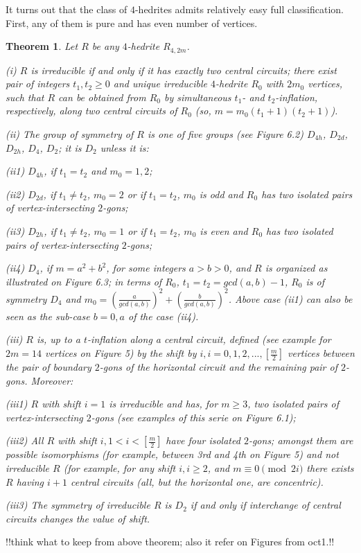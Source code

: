 \documentclass[12pt]{article}
\newtheorem{theor}{Theorem}
\begin{document}
It turns out that the class of $4$-hedrites
admits relatively easy full classification.
First, any of them is pure and has even number of vertices.



\begin{theor}

Let $R$ be any $4$-hedrite $R_{4,2m}$.

(i) $R$ is irreducible if and only if it has exactly two central
circuits; there exist pair of integers
$t_1,t_2 \ge 0$ and
unique irreducible $4$-hedrite $R_0$ with $2m_0$ vertices, such that $R$ can be obtained from
$R_0$ by simultaneous $t_1$- and $t_2$-inflation, respectively, along two
central circuits of $R_0$ (so, $m=m_0(t_1+1)(t_2+1)$).

(ii) The group of symmetry of $R$ is one of five groups (see Figure 6.2)
$D_{4h}$, $D_{2d}$, $D_{2h}$, $D_4$, $D_2$; it is $D_2$ unless it is:     

(ii1) $D_{4h}$, if $t_1=t_2$ and $m_0=1,2$;

(ii2) $D_{2d}$, if $t_1 \neq t_2$, $m_0=2$ or if $t_1=t_2$, $m_0$ is odd
and $R_0$ has two isolated pairs of vertex-intersecting $2$-gons;

(ii3) $D_{2h}$, if $t_1 \neq t_2$, $m_0=1$ or if $t_1=t_2$, $m_0$ is even
and $R_0$ has two isolated pairs of vertex-intersecting $2$-gons;

(ii4) $D_4$, if $m=a^2+b^2$, for some integers $a>b>0$, and $R$ is organized as illustrated on Figure 6.3; in terms of $R_0$, 
$t_1=t_2=gcd(a,b)-1$, $R_0$ is of symmetry $D_4$ and 
$m_0=(\frac{a}{gcd(a,b)})^2+(\frac{b}{gcd(a,b)})^2$. Above case (ii1) can also
be seen as the sub-case $b=0,a$ of the case (ii4).

(iii) $R$ is, up to a $t$-inflation along a central 
circuit, defined (see example for $2m=14$ vertices on Figure 5) by the shift by $i, i=0,1,2,..., [\frac{m}{2}]$ vertices between the pair
of boundary $2$-gons of the horizontal circuit and the remaining pair of
$2$-gons. Moreover:

(iii1) $R$ with shift $i=1$ is irreducible and has, for $m \ge 3$,
two isolated pairs of vertex-intersecting $2$-gons (see examples of this serie
on Figure 6.1);

(iii2) All $R$ with shift $i, 1<i< [\frac{m}{2}]$ have four isolated $2$-gons;
amongst them are possible isomorphisms (for example, between 3rd and 4th on
Figure 5) and not irreducible $R$ (for example,
for any shift $i, i \ge 2$, and $m \equiv0\pmod{2i}$ there exists  
$R$
having $i+1$ central circuits (all, but the horizontal one, are concentric).
  
(iii3) The symmetry of irreducible $R$ is $D_2$ if and only if interchange of 
central circuits changes the value of shift.

\end{theor}
!!think what to keep from above theorem; also it refer on
Figures from oct1.!!
\end{document}
